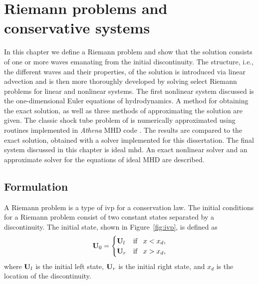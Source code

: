 %
%


\chapter[Riemann problems and conservative systems]{Riemann problems and conservative systems}
\label{chp:riemann}

In this chapter we define a Riemann problem and show that the solution consists of one or more waves emanating from the initial discontinuity.  The structure, i.e., the different waves and their properties, of the solution is introduced via linear advection and is then more thoroughly developed by solving select Riemann problems for linear and nonlinear systems.  The first nonlinear system discussed is the one-dimensional Euler equations of hydrodynamics.  A method for obtaining the exact solution, as well as three methods of approximating the solution are given.  The classic shock tube problem of \citet{Sod:1978} is numerically approximated using routines implemented in \emph{Athena} MHD code \citep{Stone:2008,AthenaSite}.  The results are compared to the exact solution, obtained with a solver implemented for this dissertation.  The final system discussed in this chapter is ideal \gls{mhd}.  An exact nonlinear solver and an approximate solver for the equations of ideal MHD are described. 

\section[Formulation]{Formulation}
\label{sec:formulation}

A Riemann problem is a type of \gls{ivp} for a conservation law.  The initial conditions for a Riemann problem consist of two constant states separated by a discontinuity.  The initial state, shown in Figure~\ref{fig:ivp}, is defined as
\begin{gather}
\label{eqn:ivp} 
\mathbf{U}_0 = 
\begin{cases}
\mathbf{U}_l & \text{if}\;\;\; x < x_d, \\
\mathbf{U}_r & \text{if}\;\;\; x > x_d, \\
\end{cases}
\end{gather} 
where $\mathbf{U}_l$ is the initial left state, $\mathbf{U}_r$ is the initial right state, and $x_d$ is the location of the discontinuity.

